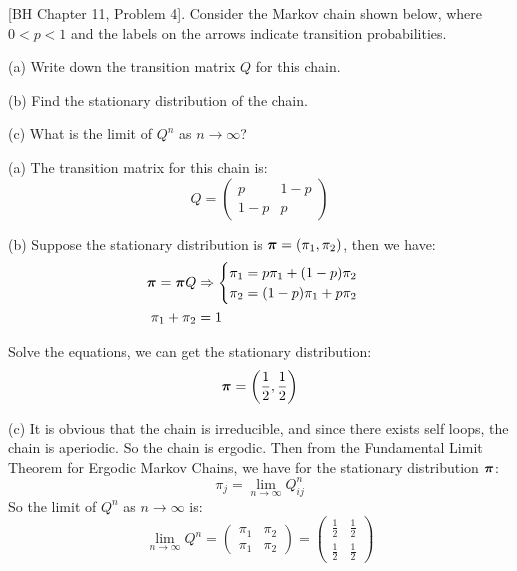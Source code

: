 \begin{homeworkProblem}

[BH Chapter 11, Problem 4]. Consider the Markov chain shown below, where $0<p<1$ and the labels on the arrows indicate transition probabilities.
\begin{center}
\end{center}

(a) Write down the transition matrix $Q$ for this chain.

(b) Find the stationary distribution of the chain.

(c) What is the limit of $Q^n$ as $n \rightarrow \infty$?

\solution

(a) The transition matrix for this chain is:
$$Q=\begin{pmatrix}
p & 1-p \\
1-p & p
\end{pmatrix}$$

(b) Suppose the stationary distribution is $\boldsymbol{\pi}=(\pi_1,\pi_2)$, then we have:
\begin{align*}
\boldsymbol{\pi} = \boldsymbol{\pi} Q &\Rightarrow \begin{cases}
\pi_1 = p\pi_1 + (1-p)\pi_2 \\
\pi_2 = (1-p)\pi_1 + p\pi_2
\end{cases} \\
\pi_1 + \pi_2 &= 1
\end{align*}

Solve the equations, we can get the stationary distribution:
$$\boldsymbol{\pi} = \left(\frac{1}{2}, \frac{1}{2}\right)$$

(c) It is obvious that the chain is irreducible, and since there exists self loops, the chain is aperiodic. So the chain is ergodic. Then from the Fundamental Limit Theorem for Ergodic Markov Chains, we have for the stationary distribution $\boldsymbol{\pi}$:
$$\pi_j=\lim_{n\to\infty} Q^n_{ij}$$
So the limit of $Q^n$ as $n \rightarrow \infty$ is:
$$\lim_{n\to\infty} Q^n = \begin{pmatrix}
\pi_1 & \pi_2 \\
\pi_1 & \pi_2
\end{pmatrix}= \begin{pmatrix}
\frac{1}{2} & \frac{1}{2} \\
\frac{1}{2} & \frac{1}{2}
\end{pmatrix}$$

\end{homeworkProblem}

\newpage